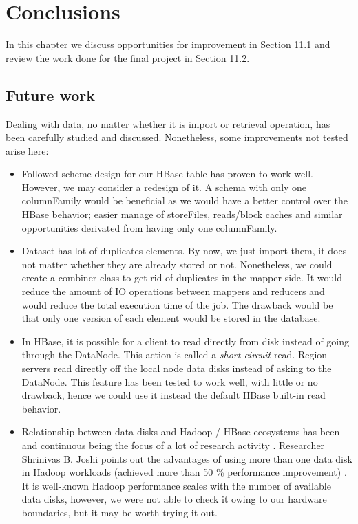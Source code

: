 \chapter{Conclusions}
\label{chapter:conclusions}

In this chapter we discuss opportunities for improvement in Section 11.1 and review the work done for the final project in Section 11.2.

\section{Future work}

Dealing with data, no matter whether it is import or retrieval operation, has been carefully studied and discussed. Nonetheless, some improvements not tested arise here:
\begin{itemize}
\item Followed scheme design for our HBase table has proven to work well. However, we may consider a redesign of it. A schema with only one columnFamily would be beneficial as we would have a better control over the HBase behavior; easier manage of storeFiles, reads/block caches and similar opportunities derivated from having only one columnFamily. 
\item Dataset has lot of duplicates elements. By now, we just import them, it does not matter whether they are already stored or not. Nonetheless, we could create a combiner class to get rid of duplicates in the mapper side. It would reduce the amount of IO operations between mappers and reducers and would reduce the total execution time of the job. The drawback would be that only one version of each element would be stored in the database.
\item In HBase, it is possible for a client to read directly from disk instead of going through the DataNode. This action is called a \textit{short-circuit} read. Region servers read directly off the local node data disks instead of asking to the DataNode. This feature has been tested to work well, with little or no drawback, hence we could use it instead the default HBase built-in read behavior.
\item Relationship between data disks and Hadoop / HBase ecosystems has been and continuous being the focus of a lot of research activity \cite{kangcase} \cite{fan2009diskreduce} \cite{awasthi2012hybrid}. Researcher Shrinivas B. Joshi points out the advantages of using more than one data disk in Hadoop workloads (achieved more than 50 \% performance improvement) \cite{joshi2012apache}. It is well-known Hadoop performance scales with the number of available data disks, however, we were not able to check it owing to our hardware boundaries, but it may be worth trying it out. 
\end{itemize}


